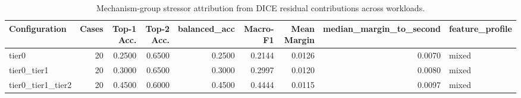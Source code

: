 \begin{table}[t]
\centering
\caption{Mechanism-group stressor attribution from DICE residual contributions across workloads.}
\label{tab:dice_stressor_diagnosis}
\footnotesize
\begin{tabular}{lrrrrrrrl}
\toprule
Configuration & Cases & Top-1 Acc. & Top-2 Acc. & balanced_acc & Macro-F1 & Mean Margin & median_margin_to_second & feature_profile \\
\midrule
tier0 & 20 & 0.2500 & 0.6500 & 0.2500 & 0.2144 & 0.0126 & 0.0070 & mixed \\
tier0_tier1 & 20 & 0.3000 & 0.6500 & 0.3000 & 0.2997 & 0.0120 & 0.0080 & mixed \\
tier0_tier1_tier2 & 20 & 0.4500 & 0.6000 & 0.4500 & 0.4444 & 0.0115 & 0.0097 & mixed \\
\bottomrule
\end{tabular}

\end{table}

